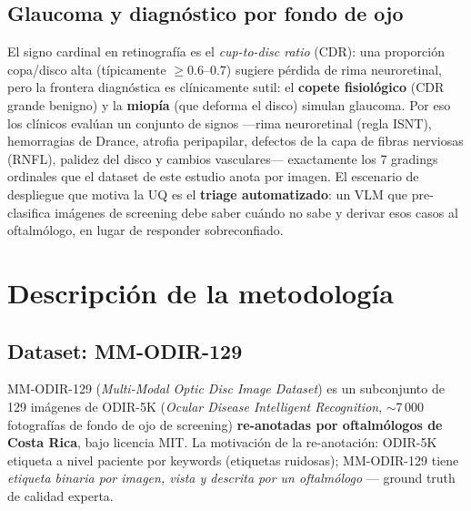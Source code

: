 \documentclass[12pt,a4paper]{article}
\begin{document}
\subsection{Glaucoma y diagnóstico por fondo de ojo}

El signo cardinal en retinografía es el \emph{cup-to-disc ratio} (CDR):
una proporción copa/disco alta (típicamente $\geq 0.6$--$0.7$) sugiere
pérdida de rima neuroretinal, pero la frontera diagnóstica es clínicamente
sutil: el \textbf{copete fisiológico} (CDR grande benigno) y la
\textbf{miopía} (que deforma el disco) simulan glaucoma. Por eso los
clínicos evalúan un conjunto de signos ---rima neuroretinal (regla ISNT),
hemorragias de Drance, atrofia peripapilar, defectos de la capa de fibras
nerviosas (RNFL), palidez del disco y cambios vasculares--- exactamente
los 7 gradings ordinales que el dataset de este estudio anota por imagen.
El escenario de despliegue que motiva la UQ es el \textbf{triage
automatizado}: un VLM que pre-clasifica imágenes de screening debe saber
cuándo no sabe y derivar esos casos al oftalmólogo, en lugar de responder
sobreconfiado.

\section{Descripción de la metodología}
\label{sec:metodologia}

\subsection{Dataset: MM-ODIR-129}
\label{sec:dataset}

MM-ODIR-129 (\emph{Multi-Modal Optic Disc Image Dataset}) es un subconjunto
de 129 imágenes de ODIR-5K (\emph{Ocular Disease Intelligent Recognition},
$\sim$7\,000 fotografías de fondo de ojo de screening) \textbf{re-anotadas
por oftalmólogos de Costa Rica}, bajo licencia MIT. La motivación de la
re-anotación: ODIR-5K etiqueta a nivel paciente por keywords (etiquetas
ruidosas); MM-ODIR-129 tiene \emph{etiqueta binaria por imagen, vista y
descrita por un oftalmólogo} --- ground truth de calidad experta.
\end{document}
